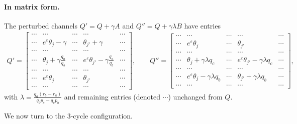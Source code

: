\documentclass{article}
\theoremstyle{plain}
\theoremstyle{definition}
\theoremstyle{plain}
\begin{document}
\paragraph{In matrix form.}
The perturbed channels $Q'=Q+\gamma A$ and $Q''=Q+\gamma\lambda B$ have entries
\begin{align*}
    Q'=
    \begin{bmatrix}
        \cdots & \cdots & \cdots & \cdots & \cdots \\
        \cdots & e^\varepsilon \theta_j-\gamma & \cdots & \theta_{j'}+\gamma & \cdots \\
        \cdots & \cdots & \cdots & \cdots & \cdots \\
        \cdots & \theta_j+\gamma \frac{q_a}{q_b} & \cdots & e^\varepsilon \theta_{j'}-\gamma \frac{q_a}{q_b} & \cdots \\
        \cdots & \cdots & \cdots & \cdots & \cdots \\
        \cdots & e^\varepsilon \theta_j & \cdots & \theta_{j'} & \cdots \\
        \cdots & \cdots & \cdots & \cdots & \cdots
    \end{bmatrix},
    \qquad
    Q''=
    \begin{bmatrix}
        \cdots & \cdots & \cdots & \cdots & \cdots \\
        \cdots & e^\varepsilon \theta_j & \cdots & \theta_{j'} & \cdots \\
        \cdots & \cdots & \cdots & \cdots & \cdots \\
        \cdots & \theta_j+\gamma\lambda q_c & \cdots & e^\varepsilon \theta_{j'}-\gamma\lambda q_c & \cdots \\
        \cdots & \cdots & \cdots & \cdots & \cdots \\
        \cdots & e^\varepsilon \theta_j-\gamma\lambda q_b & \cdots & \theta_{j'}+\gamma\lambda q_b & \cdots \\
        \cdots & \cdots & \cdots & \cdots & \cdots
    \end{bmatrix},
\end{align*}
with $\lambda = \frac{q_a(r_b-r_a)}{q_b p_c-q_c p_b}$ and remaining entries (denoted $\cdots$) unchanged from $Q$.


We now turn to the $3$-cycle configuration.
\end{document}
